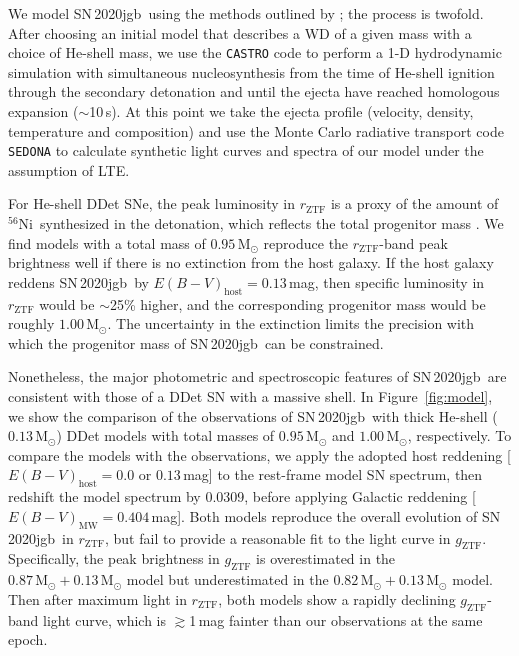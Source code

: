 \documentclass[twocolumn]{aastex631}
\newcommand{\sn}{SN\,2020jgb}
\newcommand{\Ni}{$^{56}\mathrm{Ni}$}
\newcommand{\Msun}{\mathrm{M_\odot}}
\newcommand{\chang}[1]{\textcolor{blue}{[Chang: #1]}}
\begin{document}
We model \sn\ using the methods outlined by \citet{polin_observational_2019}; the process is twofold. After choosing an initial model that describes a WD of a given mass with a choice of He-shell mass, we use the \texttt{CASTRO} code \citep{Almgren_Castro_2010} to perform a 1-D hydrodynamic simulation with simultaneous nucleosynthesis from the time of He-shell ignition through the secondary detonation and until the ejecta have reached homologous expansion ($\sim$10\,s). At this point we take the ejecta profile (velocity, density, temperature and composition) and use the Monte Carlo radiative transport code \texttt{SEDONA} \citep{Kasen_Sedona_2006} to calculate synthetic light curves and spectra of our model under the assumption of LTE. 

For He-shell DDet SNe, the peak luminosity in $r_\mathrm{ZTF}$ is a proxy of the amount of \Ni\ synthesized in the detonation, which reflects the total progenitor mass \citep[C/O core $+$ He-shell;][]{polin_observational_2019}. We find models with a total mass of $0.95\,\Msun$ reproduce the $r_\mathrm{ZTF}$-band peak brightness well if there is no extinction from the host galaxy. If the host galaxy reddens \sn\ by $E(B-V)_\mathrm{host}=0.13$\,mag, then specific luminosity in $r_\mathrm{ZTF}$ would be $\sim$25\% higher, and the corresponding progenitor mass would be roughly $1.00\,\Msun$. The uncertainty in the extinction limits the precision with which the progenitor mass of \sn\ can be constrained.

Nonetheless, the major photometric and spectroscopic features of \sn\ are consistent with those of a DDet SN with a massive shell. In Figure~\ref{fig:model}, we show the comparison of the observations of \sn\ with thick He-shell ($0.13\,\Msun$) DDet models with total masses of $0.95\,\Msun$ and $1.00\,\Msun$, respectively. To compare the models with the observations, we apply the adopted host reddening [$E(B-V)_\mathrm{host} = 0.0$ or $0.13$\,mag] to the rest-frame model SN spectrum, then redshift the model spectrum by 0.0309, before applying Galactic reddening [$E(B-V)_\mathrm{MW}=0.404$\,mag]. Both models reproduce the overall evolution of \sn\ in $r_\mathrm{ZTF}$, but fail to provide a reasonable fit to the light curve in $g_\mathrm{ZTF}$. Specifically, the peak brightness in $g_\mathrm{ZTF}$ is overestimated in the $0.87\,\Msun+0.13\,\Msun$ model but underestimated in the $0.82\,\Msun+0.13\,\Msun$ model. Then after maximum light in $r_\mathrm{ZTF}$, both models show a rapidly declining $g_\mathrm{ZTF}$-band light curve, which is $\gtrsim$1\,mag fainter than our observations at the same epoch. 
\end{document}
